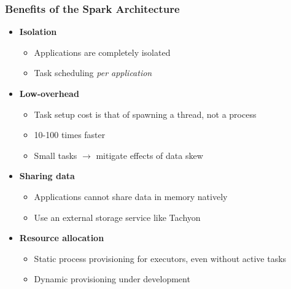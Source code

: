 \begin{frame}
\frametitle{Benefits of the Spark Architecture}
\begin{itemize}
	\item {\bf Isolation}
	\begin{itemize}
		\item Applications are completely isolated
		\item Task scheduling \emph{per application}
	\end{itemize}

	\item {\bf Low-overhead}
	\begin{itemize}
		\item Task setup cost is that of spawning a thread, not a process
		\item 10-100 times faster
		\item {\color{red} Small tasks $\to$ mitigate effects of data skew}
	\end{itemize}

	\item {\bf Sharing data}
	\begin{itemize}
		\item Applications cannot share data in memory natively
		\item Use an external storage service like Tachyon
	\end{itemize}

	\item {\bf Resource allocation}
	\begin{itemize}
		\item Static process provisioning for executors, even without active tasks
		\item Dynamic provisioning under development
	\end{itemize}
\end{itemize}
\end{frame}
